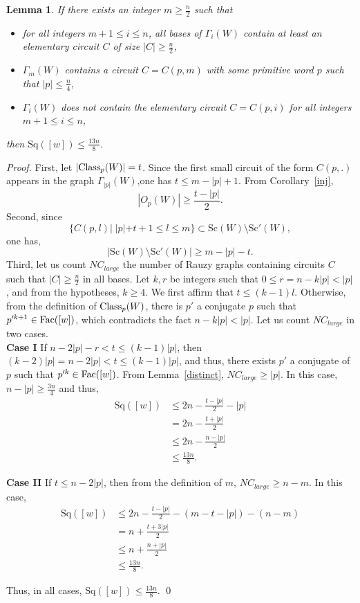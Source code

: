 \documentclass[runningheads,envcountsame,a4paper]{llncs}
\newtheorem{lem}[thm]{Lemma}
\newcommand{\fac}{\hbox{\rm Fac}}
\newcommand{\Class}{\hbox{\rm Class}}
\newcommand{\sq}{\mathrm{Sq}}
\renewcommand{\sc}{\mathrm{Sc}}
\begin{document}
\begin{lem}\label{Case2}
If there exists an integer $m\geq\frac{n}{2}$ such that 
\begin{itemize}
    \item[1] for all integers $m+1\leq i \leq n$, all bases of $\Gamma_i(W)$ contain at least an elementary circuit $C$ of size $|C| \geq \frac{n}{2}$,
    \item[2]$\Gamma_m(W)$ contains a circuit $C=C(p,m)$ with some primitive word $p$ such that $|p| \leq \frac{n}{4}$,
    \item[3]$\Gamma_i(W)$ does not contain the elementary circuit $C=C(p,i)$ for all integers $m+1 \leq i \leq n$,
\end{itemize}
 then $\sq([w])\leq \frac{13n}{8}$.
\end{lem}

\begin{proof}
 First, let $|\Class_p(W)|=t$. Since the first small circuit of the form $C(p,.)$ appears in the graph $\Gamma_{|p|}(W)$,one has $t \leq m-|p|+1$.
 From Corollary~\ref{inj}, 
 $$|O_p(W)|\geq \frac{t-|p|}{2}.$$ 
 Second, since $$\{C(p,l)| \;|p|+t+1 \leq l\leq m\} \subset \sc(W)\setminus \sc'(W),$$
one has, 
$$|\sc(W)\setminus \sc'(W)|\geq m-|p|-t.$$
Third, let us count $NC_{large}$ the number of Rauzy graphs containing circuits $C$ such that $|C| \geq \frac{n}{2}$ in all bases. Let $k,r$ be integers such that $0 \leq r=n-k|p|<|p|$, and from the hypotheses, $k \geq 4$. We first affirm that $t \leq (k-1)l$. Otherwise, from the definition of $\Class_p(W)$, there is $p'$ a conjugate $p$ such that $p'^{k+1} \in \fac([w])$, which contradicts the fact $n-k|p|<|p|$. Let us count $NC_{large}$ in two cases.\\


\textbf{Case I} If $n-2|p|-r < t \leq (k-1)|p|$, then $(k-2)|p|=n-2|p|< t \leq (k-1)|p|$, and thus, there exists $p'$ a conjugate of $p$ such that $p'^k \in \fac([w])$. From Lemma~\ref{distinct}, $NC_{large}\geq |p|$. In this case, $n-|p| \geq \frac{3n}{4}$ and thus,
\begin{align*}
  \sq([w]) &\leq 2n-\frac{t-|p|}{2}-|p|\\
  &=2n-\frac{t+|p|}{2}\\
  &\leq 2n-\frac{n-|p|}{2}\\
  &\leq \frac{13n}{8}.
\end{align*}

\textbf{Case II} If $ t \leq n-2|p|$, then from the definition of $m$, $NC_{large}\geq n-m$. In this case, 
\begin{align*}
  \sq([w]) &\leq 2n-\frac{t-|p|}{2}-(m-t-|p|)-(n-m)\\
  &=n+\frac{t+3|p|}{2}\\
  &\leq n+\frac{n+|p|}{2}\\
  &\leq \frac{13n}{8}.
\end{align*}

 Thus, in all cases, $\sq([w]) \leq \frac{13n}{8}.$ \qed
\end{proof}
\end{document}
